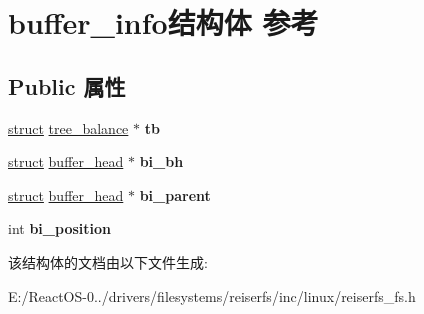 \hypertarget{structbuffer__info}{}\section{buffer\+\_\+info结构体 参考}
\label{structbuffer__info}
\subsection*{Public 属性}
\begin{DoxyCompactItemize}
\item 
\mbox{\label{structbuffer__info_ab7adcf61c84c0945f7df382ebcee0bd8}} 
\hyperlink{interfacestruct}{struct} \hyperlink{structtree__balance}{tree\+\_\+balance} $\ast$ {\bfseries tb}
\item 
\mbox{\label{structbuffer__info_a9c2824f74e9510fa592c8b07f3746ece}} 
\hyperlink{interfacestruct}{struct} \hyperlink{structbuffer__head}{buffer\+\_\+head} $\ast$ {\bfseries bi\+\_\+bh}
\item 
\mbox{\label{structbuffer__info_aa064f343deeaec56db8b2c713b00ec1f}} 
\hyperlink{interfacestruct}{struct} \hyperlink{structbuffer__head}{buffer\+\_\+head} $\ast$ {\bfseries bi\+\_\+parent}
\item 
\mbox{\label{structbuffer__info_a49e049192e9f74676cd0af1acc5db6c8}} 
int {\bfseries bi\+\_\+position}
\end{DoxyCompactItemize}


该结构体的文档由以下文件生成\+:\begin{DoxyCompactItemize}
\item 
E\+:/\+React\+O\+S-\/0../drivers/filesystems/reiserfs/inc/linux/reiserfs\+\_\+fs.\+h\end{DoxyCompactItemize}
